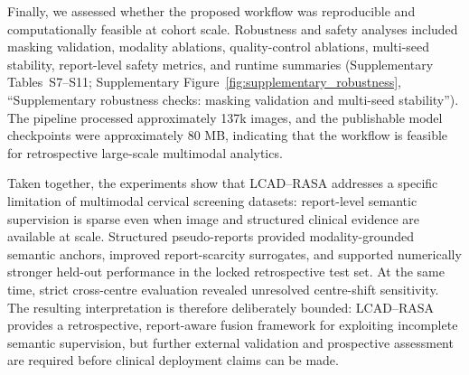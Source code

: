Finally, we assessed whether the proposed workflow was reproducible and computationally feasible at cohort scale. Robustness and safety analyses included masking validation, modality ablations, quality-control ablations, multi-seed stability, report-level safety metrics, and runtime summaries (Supplementary Tables~S7--S11; Supplementary Figure~\ref{fig:supplementary_robustness}, ``Supplementary robustness checks: masking validation and multi-seed stability''). The pipeline processed approximately 137k images, and the publishable model checkpoints were approximately 80 MB, indicating that the workflow is feasible for retrospective large-scale multimodal analytics.

Taken together, the experiments show that LCAD--RASA addresses a specific limitation of multimodal cervical screening datasets: report-level semantic supervision is sparse even when image and structured clinical evidence are available at scale. Structured pseudo-reports provided modality-grounded semantic anchors, improved report-scarcity surrogates, and supported numerically stronger held-out performance in the locked retrospective test set. At the same time, strict cross-centre evaluation revealed unresolved centre-shift sensitivity. The resulting interpretation is therefore deliberately bounded: LCAD--RASA provides a retrospective, report-aware fusion framework for exploiting incomplete semantic supervision, but further external validation and prospective assessment are required before clinical deployment claims can be made.
